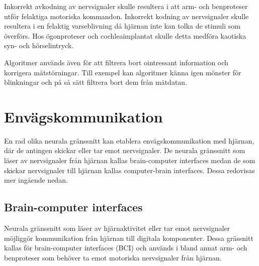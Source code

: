 \documentclass[12pt, a4paper]{article}
\begin{document}
Inkorrekt avkodning av nervsignaler skulle resultera i att arm- och benproteser utför felaktiga motoriska kommandon. Inkorrekt kodning av nervsignaler skulle resultera i en felaktig varseblivning då hjärnan inte kan tolka de stimuli som överförs. Hos ögonproteser och cochleaimplantat skulle detta medföra kaotiska syn- och hörselintryck.



Algoritmer används även för att filtrera bort ointressant information och korrigera mätstörningar. Till exempel kan algoritmer känna igen mönster för blinkningar och på så sätt filtrera bort dem från mätdatan.


\section{Envägskommunikation}

En rad olika neurala gränssnitt kan etablera envägskommunikation med hjärnan, där de antingen skickar eller tar emot nervsignaler. De neurala gränssnitt som läser av nervsignaler från hjärnan kallas brain-computer interfaces medan de som skickar nervsignaler till hjärnan kallas computer-brain interfaces. Dessa redovisas mer ingående nedan.




\subsection{Brain-computer interfaces}

Neurala gränssnitt som läser av hjärnaktivitet eller tar emot nervsignaler möjliggör kommunikation från hjärnan till digitala komponenter. Dessa grässnitt kallas för brain-computer interfaces (BCI) och används i bland annat arm- och benproteser som behöver ta emot motoriska nervsignaler från hjärnan.
\end{document}
